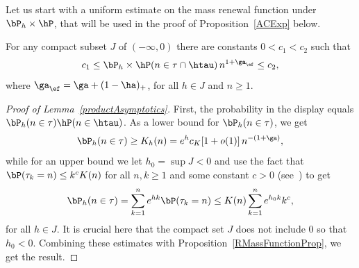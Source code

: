 Let us start with a uniform estimate on the mass renewal function under $\bP_h \times \hP$, that will be used in the proof of Proposition~\ref{ACExp} below.

\begin{lemm}\label{productAsymptotics}
For any compact subset $J$ of $(- \infty,0)$ there are constants $0 < c_1 < c_2$ such that
\begin{equation}\label{RFAsymptotics}
c_1 \leq \bP_h \times \hP(n \in \tau \cap \htau) \, n^{1 + \ga_\ef} \leq c_2,
\end{equation}
where $\ga_\ef = \ga + (1 - \ha)_+$, for all $h \in J$ and $n \geq 1$.
\end{lemm}

\begin{proof}[Proof of Lemma~\ref{productAsymptotics}]
First, the probability in the display equals $\bP_h(n \in \tau)\linebreak \hP(n \in \htau)$. As a lower bound for $\bP_h(n \in \tau)$, we get
\begin{equation}
\bP_h(n \in \tau) \geq K_h(n) = e^h c_K[1 + o(1)] \, n^{- (1 + \ga)},
\end{equation}
while for an upper bound we let $h_0 = \sup J < 0$ and use the fact that $\bP(\tau_k = n) \leq k^c K(n)$ for all $n,k \geq 1$ and some constant $c > 0$ (see~\cite[Lemma~A.5]{Gi2007}) to get
\begin{equation}
\bP_h(n \in \tau) = \sum_{k=1}^n e^{h k} \bP(\tau_k = n) \leq K(n) \sum_{k=1}^n e^{h_0 k} k^c,
\end{equation}
for all $h \in J$. It is crucial here that the compact set $J$ does not include $0$ so that $h_0 < 0$. Combining these estimates with Proposition~\ref{RMassFunctionProp}, we get the result.
\end{proof}

